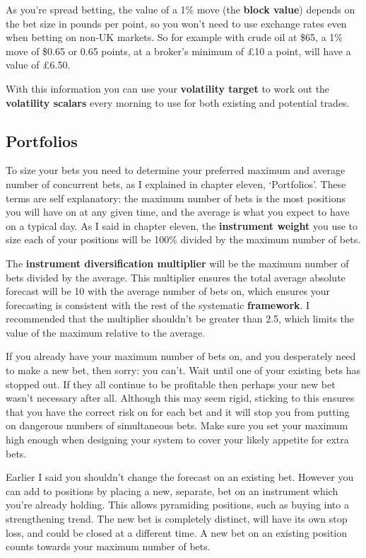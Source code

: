 As you're spread betting, the value of a 1\% move (the \textbf{block value}) depends on the bet size in pounds per point, so you won't need to use exchange rates even when betting on non-UK markets. So for example with crude oil at \$65, a 1\% move of \$0.65 or 0.65 points, at a broker's minimum of £10 a point, will have a value of £6.50.

With this information you can use your \textbf{volatility target} to work out the \textbf{volatility scalars} every morning to use for both existing and potential trades.

\subsection*{Portfolios}

To size your bets you need to determine your preferred maximum and average number of concurrent bets, as I explained in chapter eleven, ‘Portfolios'. These terms are self explanatory: the maximum number of bets is the most positions you will have on at any given time, and the average is what you expect to have on a typical day. As I said in chapter eleven, the \textbf{instrument weight} you use to size each of your positions will be 100\% divided by the maximum number of bets.

The \textbf{instrument diversification multiplier} will be the maximum number of bets divided by the average. This multiplier ensures the total average absolute forecast will be 10 with the average number of bets on, which ensures your forecasting is consistent with the rest of the systematic \textbf{framework}. I recommended that the multiplier shouldn't be greater than 2.5, which limits the value of the maximum relative to the average.

If you already have your maximum number of bets on, and you desperately need to make a new bet, then sorry: you can't. Wait until one of your existing bets has stopped out. If they all continue to be profitable then perhaps your new bet wasn't necessary after all. Although this may seem rigid, sticking to this ensures that you have the correct risk on for each bet and it will stop you from putting on dangerous numbers of simultaneous bets. Make sure you set your maximum high enough when designing your system to cover your likely appetite for extra bets.

Earlier I said you shouldn't change the forecast on an existing bet. However you can add to positions by placing a new, separate, bet on an instrument which you're already holding. This allows pyramiding positions, such as buying into a strengthening trend. The new bet is completely distinct, will have its own stop loss, and could be closed at a different time. A new bet on an existing position counts towards your maximum number of bets.

